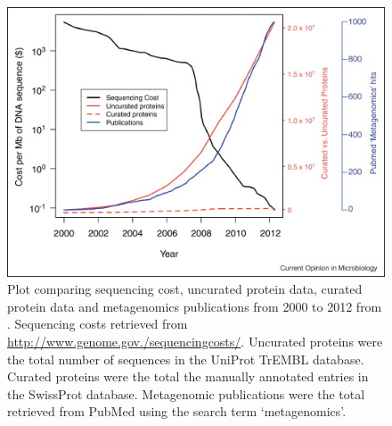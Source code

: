 \begin{figure}
\centering
\includegraphics[width=120mm]{conc_figures/seq_vs_curated.jpg}
\caption[Plot of sequencing cost, curated proteins and metagenomic publications from \citet{Temperton2012}]{Plot comparing sequencing cost, uncurated protein data, curated protein data and metagenomics publications from 2000 to 2012 from \citet{Temperton2012}.
Sequencing costs retrieved from 
\url{http://www.genome.gov./sequencingcosts/}.
Uncurated proteins were the total number of sequences in the UniProt TrEMBL database.
Curated proteins were the total the manually annotated entries in the SwissProt database.
Metagenomic publications were the total retrieved from PubMed using the search term `metagenomics'.
}
\label{fig:seq_vs_curated}

\end{figure}
